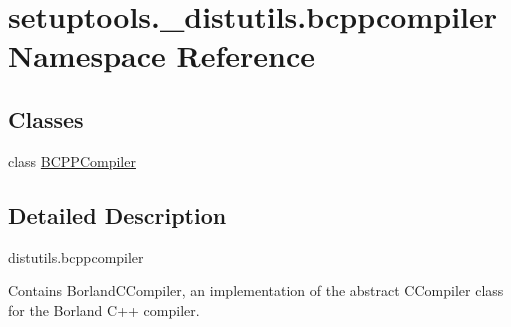 \hypertarget{namespacesetuptools_1_1__distutils_1_1bcppcompiler}{}\section{setuptools.\+\_\+distutils.\+bcppcompiler Namespace Reference}
\label{namespacesetuptools_1_1__distutils_1_1bcppcompiler}
\subsection*{Classes}
\begin{DoxyCompactItemize}
\item 
class \hyperlink{classsetuptools_1_1__distutils_1_1bcppcompiler_1_1BCPPCompiler}{B\+C\+P\+P\+Compiler}
\end{DoxyCompactItemize}


\subsection{Detailed Description}
\begin{DoxyVerb}distutils.bcppcompiler

Contains BorlandCCompiler, an implementation of the abstract CCompiler class
for the Borland C++ compiler.
\end{DoxyVerb}
 